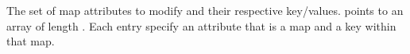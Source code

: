 The set of map attributes to modify and their respective key/values.
 points to an array of length .  Each entry
specify an attribute that is a map and a key within that map.
